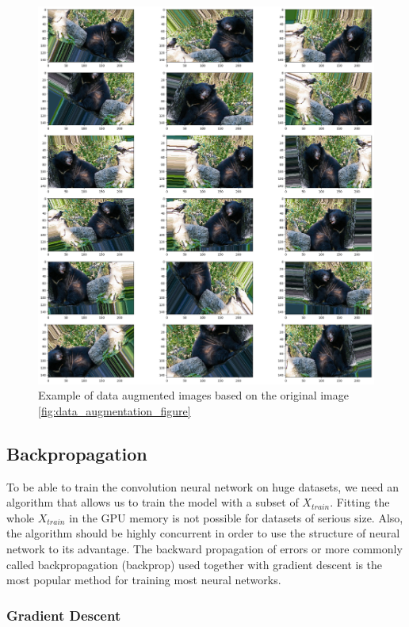 \documentclass[times, utf8, diplomski]{fer}
\begin{document}
\begin{figure}
  \includegraphics[scale=0.35]{figures/da1.png}
  \centering
  \caption{Example of data augmented images based on the original image \ref{fig:data_augmentation_figure}}
  \label{fig:data_augmentation}
\end{figure}

\subsection{Backpropagation} \label{se:backprop}

To be able to train the convolution neural network on huge datasets, we need an algorithm that allows us to train the model with a subset of $X_{train}$. Fitting the whole $X_{train}$ in the GPU memory is not possible for datasets of serious size. Also, the algorithm should be highly concurrent in order to use the structure of neural network to its advantage. The backward propagation of errors or more commonly called backpropagation (backprop) used together with gradient descent is the most popular method for training most neural networks.

\subsubsection{Gradient Descent}
\end{document}
